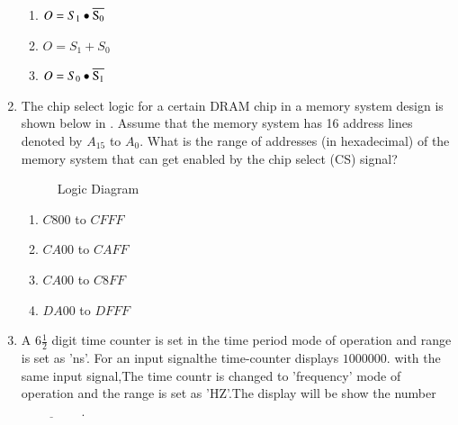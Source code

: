 \begin{enumerate}[label=\arabic*.,ref=\theenumi]
\begin{enumerate}
            \item  $O=S_1\bullet\overline{\rm S_0}$
            
            \item  $O=S_1 + S_0$
            
            \item $O=S_0\bullet\overline{\rm S _1}$
 \end{enumerate}
\item  The chip select logic for a certain DRAM chip in a memory system design is shown below
	in
.
	Assume that the memory system has 16 address lines denoted by ${A_{15}}$ to ${A_0}$. What is the range of addresses (in hexadecimal) of the memory system that can get enabled by the chip select (CS) signal?
\hfill{}

\begin{figure}[H]

\caption{Logic Diagram}
\label{fig:figure14}
\end{figure}

\begin{enumerate}
\item ${C800}$ to ${CFFF}$
\item ${CA00}$ to ${CAFF}$
\item ${CA00}$ to ${C8FF}$
\item ${DA00}$ to ${DFFF}$
\end{enumerate}  


\item A $6{\frac{1}{2}}$ digit time counter is set in the time period mode of operation and range is set as 'ns'. For an input signalthe time-counter displays $1000000$. with the same input signal,The time countr is changed to 'frequency' mode of operation and the range is set as 'HZ'.The display will be show the number$\underline{\hspace{2cm}}$.
\hfill{}



\end{enumerate}
